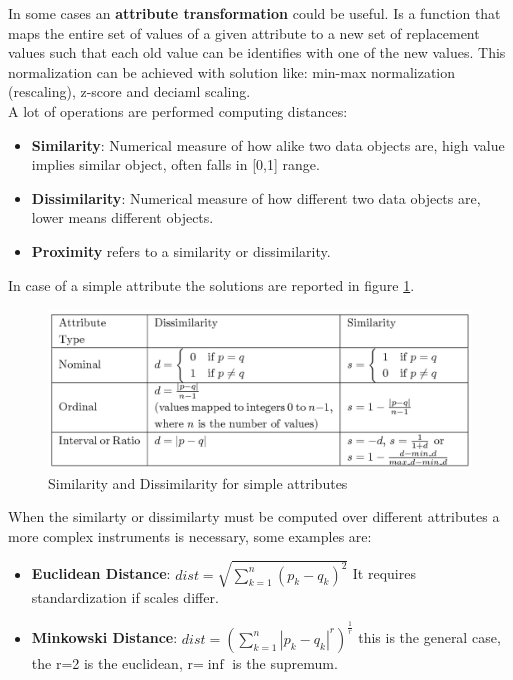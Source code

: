\documentclass[12pt]{article}
\begin{document}
In some cases an \textbf{attribute transformation} could be useful. Is a function that maps the entire set of values of a given attribute to a new set of replacement values such that each old value can be identifies with one of the new values. This normalization can be achieved with solution like: min-max normalization (rescaling), z-score and deciaml scaling.\\
A lot of operations are performed computing distances:
\begin{itemize}
  \item \textbf{Similarity}: Numerical measure of how alike two data objects are, high value implies similar object, often falls in [0,1] range.
  \item \textbf{Dissimilarity}: Numerical measure of how different two data objects are, lower means different objects.
  \item \textbf{Proximity} refers to a similarity or dissimilarity.
\end{itemize}
In case of a simple attribute the solutions are reported in figure \ref{fig:simdis}.
\begin{figure}[H]
  \includegraphics[width=\linewidth]{images/simdis.png}
  \caption{Similarity and Dissimilarity for simple attributes}
  \label{fig:simdis}
\end{figure}
When the similarty or dissimilarty must be computed over different attributes a more complex instruments is necessary, some examples are:
\begin{itemize}
  \item \textbf{Euclidean Distance}: $dist=\sqrt{\sum_{k=1}^{n}(p_k - q_k)^2}$ It requires standardization if scales differ.
  \item \textbf{Minkowski Distance}: $dist=(\sum_{k=1}^{n}|p_k - q_k|^r)^\frac{1}{r}$ this is the general case, the r=2 is the euclidean, r=$\inf$ is the supremum.
\end{itemize}
\end{document}
